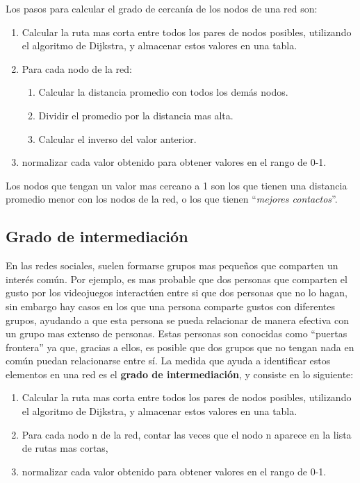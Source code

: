 Los pasos para calcular el grado de cercanía de los nodos de una red son:

\begin{enumerate}
  \item Calcular la ruta mas corta entre todos los pares de nodos posibles, utilizando el algoritmo de Dijkstra, y almacenar estos valores en una tabla.
  \item Para cada nodo de la red:
  \begin{enumerate}
    \item Calcular la distancia promedio con todos los demás nodos.
    \item Dividir el promedio por la distancia mas alta.
    \item Calcular el inverso del valor anterior.
  \end{enumerate}
  \item normalizar cada valor obtenido para obtener valores en el rango de 0-1.
\end{enumerate}

Los nodos que tengan un valor mas cercano a 1 son los que tienen una distancia promedio menor con los nodos de la red, o los que tienen ``\textit{mejores contactos}''.

\subsection{Grado de intermediación}

En las redes sociales, suelen formarse grupos mas pequeños que comparten un interés común. Por ejemplo, es mas probable que dos personas que comparten el gusto por los videojuegos interactúen entre si que dos personas que no lo hagan, sin embargo hay casos en los que una persona comparte gustos con diferentes grupos, ayudando a que esta persona se pueda relacionar de manera efectiva con un grupo mas extenso de personas. Estas personas son conocidas como ``puertas frontera'' ya que, gracias a ellos, es posible que dos grupos que no tengan nada en común puedan relacionarse entre sí. La medida que ayuda a identificar estos elementos en una red es el \textbf{grado de intermediación}, y consiste en lo siguiente:

\begin{enumerate}
  \item Calcular la ruta mas corta entre todos los pares de nodos posibles, utilizando el algoritmo de Dijkstra, y almacenar estos valores en una tabla.
  \item Para cada nodo n de la red, contar las veces que el nodo n aparece en la lista de rutas mas cortas,
  \item normalizar cada valor obtenido para obtener valores en el rango de 0-1.
\end{enumerate}

